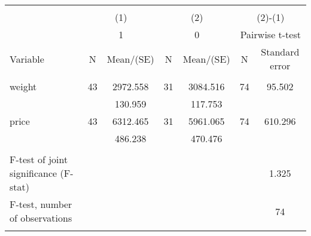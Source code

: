
\begin{tabular}{@{\extracolsep{5pt}}lcccccc}
\\[-1.8ex]\hline \hline \\[-1.8ex]
 & \multicolumn{2}{c}{(1)}  & \multicolumn{2}{c}{(2)}  & \multicolumn{2}{c}{(2)-(1)} \\
 & \multicolumn{2}{c}{1}  & \multicolumn{2}{c}{0}  & \multicolumn{2}{c}{Pairwise t-test}  \\
Variable & N & Mean/(SE) & N & Mean/(SE) & N & Standard error \\ \hline \\[-1.8ex] 
weight   & 43    &  2972.558    & 31    &  3084.516    & 74    &    95.502   \\
 &   &   130.959  &   &   117.753  &   &   \\
price   & 43    &  6312.465    & 31    &  5961.065    & 74    &   610.296   \\
 &   &   486.238  &   &   470.476  &   &   \\
\hline \\[-1.8ex]
F-test of joint significance (F-stat) & &   & &     & &      1.325   \\
F-test, number of observations & &   & &   & &  74   \\
\hline \\[-1.8ex]

\end{tabular}

